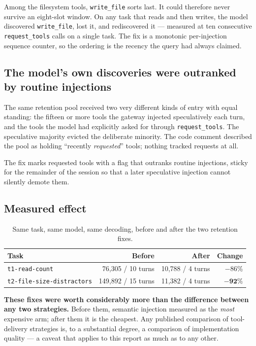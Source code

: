 \documentclass[11pt,a4paper]{article}
\begin{document}
Among the filesystem tools, \texttt{write\_file} sorts last. It could therefore never survive an
eight-slot window. On any task that reads and then writes, the model discovered \texttt{write\_file},
lost it, and rediscovered it --- measured at ten consecutive \texttt{request\_tools} calls on a single
task. The fix is a monotonic per-injection sequence counter, so the ordering is the recency the query
had always claimed.

\subsection{The model's own discoveries were outranked by routine injections}

The same retention pool received two very different kinds of entry with equal standing: the fifteen
or more tools the gateway injected speculatively each turn, and the tools the model had explicitly
asked for through \texttt{request\_tools}. The speculative majority evicted the deliberate minority.
The code comment described the pool as holding ``recently \emph{requested}'' tools; nothing tracked
requests at all.

The fix marks requested tools with a flag that outranks routine injections, sticky for the remainder
of the session so that a later speculative injection cannot silently demote them.

\subsection{Measured effect}

\begin{table}[h]
\centering
\small
\begin{tabular}{@{}lrrr@{}}
\toprule
\textbf{Task} & \textbf{Before} & \textbf{After} & \textbf{Change} \\
\midrule
\texttt{t1-read-count}            & 76,305 / 10 turns & 10,788 / 4 turns & $-$86\% \\
\texttt{t2-file-size-distractors} & 149,892 / 15 turns & 11,382 / 4 turns & $\mathbf{-92\%}$ \\
\bottomrule
\end{tabular}
\caption{Same task, same model, same decoding, before and after the two retention fixes.}
\label{tab:fixes}
\end{table}

\textbf{These fixes were worth considerably more than the difference between any two strategies.}
Before them, semantic injection measured as the \emph{most} expensive arm; after them it is the
cheapest. Any published comparison of tool-delivery strategies is, to a substantial degree, a
comparison of implementation quality --- a caveat that applies to this report as much as to any
other.
\end{document}
